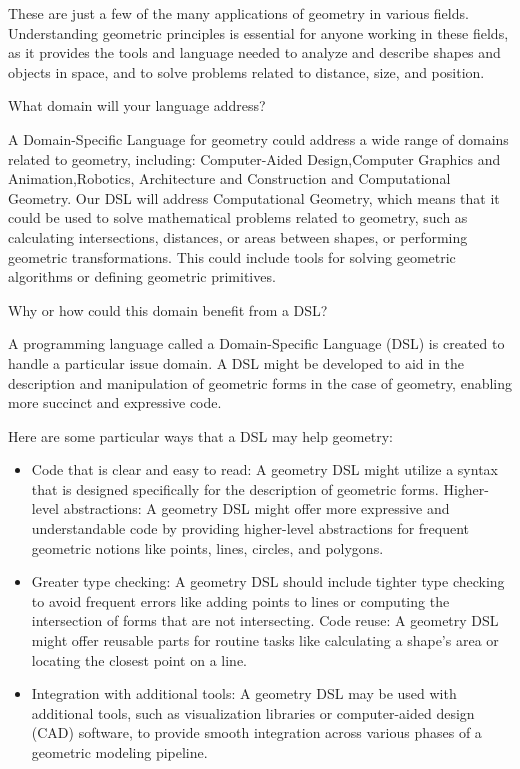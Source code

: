 \noindent These are just a few of the many applications of geometry in various fields. Understanding geometric principles is essential for anyone working in these fields, as it provides the tools and language needed to analyze and describe shapes and objects in space, and to solve problems related to distance, size, and position.

\noindent  What domain will your language address?

A Domain-Specific Language for geometry could address a wide range of domains related to geometry, including: Computer-Aided Design,Computer Graphics and Animation,Robotics, Architecture and Construction and Computational Geometry. Our DSL will address Computational Geometry, which means that it could be used to solve mathematical problems related to geometry, such as calculating intersections, distances, or areas between shapes, or performing geometric transformations. This could include tools for solving geometric algorithms or defining geometric primitives.

\noindent Why or how could this domain benefit from a DSL?

A programming language called a Domain-Specific Language (DSL) is created to handle a particular issue domain. A DSL might be developed to aid in the description and manipulation of geometric forms in the case of geometry, enabling more succinct and expressive code.

\noindent Here are some particular ways that a DSL may help geometry:
\begin{itemize}

\item Code that is clear and easy to read: A geometry DSL might utilize a syntax that is designed specifically for the description of geometric forms.
Higher-level abstractions: A geometry DSL might offer more expressive and understandable code by providing higher-level abstractions for frequent geometric notions like points, lines, circles, and polygons.

\item Greater type checking: A geometry DSL should include tighter type checking to avoid frequent errors like adding points to lines or computing the intersection of forms that are not intersecting.
Code reuse: A geometry DSL might offer reusable parts for routine tasks like calculating a shape's area or locating the closest point on a line.

\item Integration with additional tools: A geometry DSL may be used with additional tools, such as visualization libraries or computer-aided design (CAD) software, to provide smooth integration across various phases of a geometric modeling pipeline.
\end{itemize}

